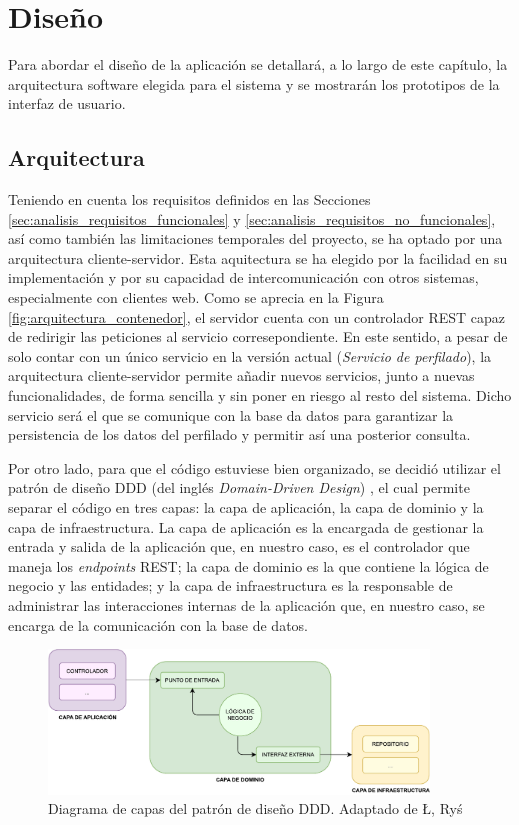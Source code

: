 \chapter{Diseño}
\label{chap:diseño}

Para abordar el diseño de la aplicación se detallará, a lo largo de este capítulo, la arquitectura software elegida para el sistema
y se mostrarán los prototipos de la interfaz de usuario.

\section{Arquitectura}
\label{sec:diseño_arquitectura}

Teniendo en cuenta los requisitos definidos en las Secciones \ref{sec:analisis_requisitos_funcionales} y \ref{sec:analisis_requisitos_no_funcionales},
así como también las limitaciones temporales del proyecto, se ha optado por una arquitectura cliente-servidor. Esta aquitectura se ha elegido
por la facilidad en su implementación y por su capacidad de intercomunicación con otros sistemas, especialmente con clientes web. Como
se aprecia en la Figura \ref{fig:arquitectura_contenedor}, el servidor cuenta con un controlador REST capaz de redirigir las peticiones al servicio
corresepondiente. En este sentido, a pesar de solo contar con un único servicio en la versión actual (\textit{Servicio de perfilado}),
la arquitectura cliente-servidor permite añadir nuevos servicios, junto a nuevas funcionalidades, de forma sencilla y sin poner en riesgo al resto del sistema.
Dicho servicio será el que se comunique con la base da datos para garantizar la persistencia de los datos del perfilado y permitir así
una posterior consulta.

\bigskip
Por otro lado, para que el código estuviese bien organizado, se decidió utilizar el patrón de diseño DDD (del inglés \textit{Domain-Driven Design}) \cite{ddd}, el cual
permite separar el código en tres capas: la capa de aplicación, la capa de dominio y la capa de infraestructura. La capa de aplicación es la encargada de gestionar
la entrada y salida de la aplicación que, en nuestro caso, es el controlador que maneja los \textit{endpoints} REST; la capa de dominio es la que contiene la lógica
de negocio y las entidades; y la capa de infraestructura es la responsable de administrar las interacciones internas de la aplicación que, en nuestro
caso, se encarga de la comunicación con la base de datos.

\begin{figure}[H]
	\centering
	\includegraphics[width=0.9\textwidth]{diagramas/ddd.pdf}
	\caption{Diagrama de capas del patrón de diseño DDD. Adaptado de Ł, Ryś \cite{dddblog}}
	\label{fig:ddd}
\end{figure}

